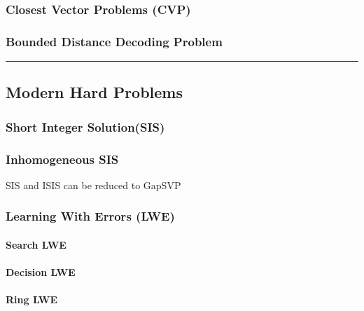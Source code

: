 \documentclass[11pt]{article}
\begin{document}
    \subsubsection{Closest Vector Problems
(CVP)}\label{closest-vector-problems-cvp}

    \subsubsection{Bounded Distance Decoding
Problem}\label{bounded-distance-decoding-problem}

\begin{center}\rule{0.5\linewidth}{0.5pt}\end{center}

    \subsection{Modern Hard Problems}\label{modern-hard-problems}

    \subsubsection{Short Integer
Solution(SIS)}\label{short-integer-solutionsis}

    \subsubsection{Inhomogeneous SIS}\label{inhomogeneous-sis}

SIS and ISIS can be reduced to GapSVP

    \subsubsection{Learning With Errors
(LWE)}\label{learning-with-errors-lwe}

    \paragraph{Search LWE}\label{search-lwe}

    \paragraph{Decision LWE}\label{decision-lwe}

    \paragraph{Ring LWE}\label{ring-lwe}


    
    
    
\end{document}
